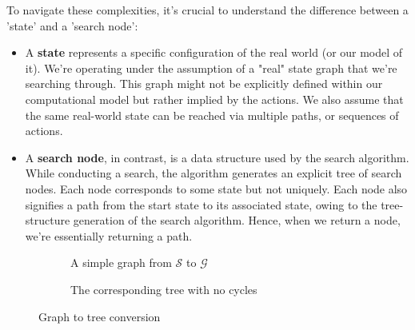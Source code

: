 \documentclass[a4paper,UKenglish,cleveref, autoref, thm-restate]{qlinhta}
\begin{document}
    To navigate these complexities, it's crucial to understand the difference between a 'state' and a 'search node':
    \begin{itemize}
        \item A \textbf{state} represents a specific configuration of the real world (or our model of it). We're operating under the assumption of a "real" state graph that we're searching through. This graph might not be explicitly defined within our computational model but rather implied by the actions. We also assume that the same real-world state can be reached via multiple paths, or sequences of actions.
        \item A \textbf{search node}, in contrast, is a data structure used by the search algorithm. While conducting a search, the algorithm generates an explicit tree of search nodes. Each node corresponds to some state but not uniquely. Each node also signifies a path from the start state to its associated state, owing to the tree-structure generation of the search algorithm. Hence, when we return a node, we're essentially returning a path.
    \end{itemize}

    \begin{figure}[h]
        \centering
        \begin{subfigure}{.5\textwidth}
            \centering
            \caption{A simple graph from $\mathcal{S}$ to $\mathcal{G}$}
        \end{subfigure}%
        \begin{subfigure}{.5\textwidth}
            \centering
            \caption{The corresponding tree with no cycles}
        \end{subfigure}
        \caption{Graph to tree conversion}
        \label{fig:conversion_tree}
    \end{figure}
\end{document}
